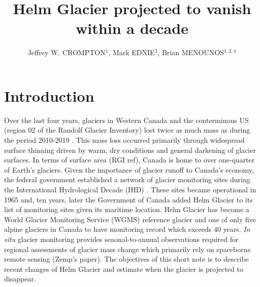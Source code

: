 \documentclass[annals,twocolumn,letterpaper]{igs}
\begin{document}
\title[Deglaciation of Helm]{Helm Glacier projected to vanish within a decade}

\author[gsc]{Jeffrey W. CROMPTON$^1$, Mark EDNIE$^{2}$, Brian MENOUNOS$^{1,2,4}$}




\maketitle

\section{Introduction}

Over the last four years, glaciers in Western Canada and the conterminous US (region 02 of the Randolf Glacier Inventory) lost twice as much mass as during the period 2010-2019  \citep{Menounos2025}. This mass loss occurred primarily through widespread surface thinning driven by warm, dry conditions and general darkening of glacier surfaces. In terms of surface area (RGI ref), Canada is home to over one-quarter of Earth's glaciers.  Given the importance of glacier runoff to Canada's economy, the federal government established a network of glacier monitoring sites during the International Hydrological Decade (IHD) \citep{Ommanney1986}. These sites became operational in 1965 and, ten years, later the Government of Canada added Helm Glacier to its list of monitoring sites \cite{Ommanney2002} given its maritime location. Helm Glacier has become a World Glacier Monitoring Service (WGMS) reference glacier and one of only five alpine glaciers in Canada to have monitoring record which exceeds 40 years.   \emph{In situ} glacier monitoring provides seaonal-to-annual observations required for regional assessments of glacier mass change which primarily rely on spaceborne remote sensing (Zemp's paper). The objectives of this short note is to describe recent changes of Helm Glacier and estimate when the glacier is projected to disappear. 
\end{document}
